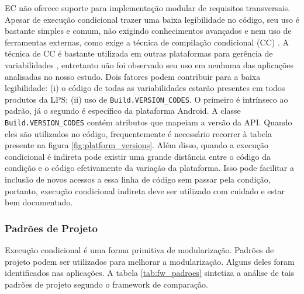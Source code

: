 EC não oferece suporte para implementação modular de requisitos transversais.
Apesar de execução condicional trazer uma baixa legibilidade no código, seu uso
é bastante simples e comum, não exigindo conhecimentos avançados e nem uso de
ferramentas externas, como exige a técnica de compilação condicional (CC) %
\cite{Medeiros2015}. A técnica de CC é bastante utilizada em outras plataformas
para gerência de variabilidades \cite{Liebig2010}, entretanto não foi observado
seu uso em nenhuma das aplicações analisadas no nosso estudo. Dois fatores podem
contribuir para a baixa legibilidade: (i) o código de todas as variabilidades
estarão presentes em todos produtos da LPS; (ii) uso de \texttt{Build.VERSION\_CODES}.
O primeiro é intrínseco ao padrão, já o segundo é específico da plataforma Android.
A classe \texttt{Build.VERSION\_CODES} contém atributos que mapeiam a versão da API.
Quando eles são utilizados no código, frequentemente é necessário recorrer à tabela
presente na figura \ref{fig:platform_versions}. Além disso, quando a execução
condicional é indireta pode existir uma grande distância entre o código da condição
e o código efetivamente da variação da plataforma. Isso pode facilitar a inclusão de
novos acessos a essa linha de código sem passar pela condição, portanto, execução
condicional indireta deve ser utilizado com cuidado e estar bem documentado.

\subsubsection{Padrões de Projeto}
Execução condicional é uma forma primitiva de modularização. Padrões de projeto
podem ser utilizados para melhorar a modularização. Alguns deles foram identificados
nas aplicações. A tabela \ref{tab:fw_padroes} sintetiza a análise de tais padrões de
projeto segundo o framework de comparação.


